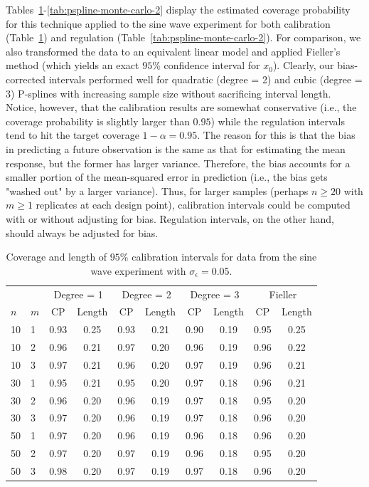 \documentclass[cmfont,usenames,dvipsnames,leqno]{afit-etd}\usepackage[]{graphicx}\usepackage[]{color}
\begin{document}
Tables~\ref{tab:pspline-monte-carlo-1}-\ref{tab:pspline-monte-carlo-2} display the estimated coverage probability for this technique applied to the sine wave experiment for both calibration (Table~\ref{tab:pspline-monte-carlo-1}) and regulation (Table~\ref{tab:pspline-monte-carlo-2}). For comparison, we also transformed the data to an equivalent linear model and applied Fieller's method (which yields an exact $95\%$ confidence interval for $x_0$). Clearly, our bias-corrected intervals performed well for quadratic (degree = 2) and cubic (degree = 3) \ac{P-spline}s with increasing sample size without sacrificing interval length. Notice, however, that the calibration results are somewhat conservative (i.e., the coverage probability is slightly larger than $0.95$) while the regulation intervals tend to hit the target coverage $1-\alpha = 0.95$. The reason for this is that the bias in predicting a future observation is the same as that for estimating the mean response, but the former has larger variance. Therefore, the bias accounts for a smaller portion of the mean-squared error in prediction (i.e., the bias gets "washed out" by a larger variance). Thus, for larger samples (perhaps $n \ge 20$ with $m \ge 1$ replicates at each design point), calibration intervals could be computed with or without adjusting for bias. Regulation intervals, on the other hand, should always be adjusted for bias.




\begin{table}[H]%
\centering
  \begin{tabular}{llcccccccc}
  \toprule
  \phantom{abc} & \phantom{abc} & \multicolumn{2}{c}{Degree = 1} & \multicolumn{2}{c}{Degree = 2} & \multicolumn{2}{c}{Degree = 3} & \multicolumn{2}{c}{Fieller} \\
  \cline{3-10}
  $n$ & $m$ & CP & Length & CP & Length & CP & Length & CP & Length \\
  \hline
  10  &  1  & 0.93 & 0.25 & 0.93 & 0.21 & 0.90 & 0.19 & 0.95 & 0.25 \\
  10  &  2  & 0.96 & 0.21 & 0.97 & 0.20 & 0.96 & 0.19 & 0.96 & 0.22 \\
  10  &  3  & 0.97 & 0.21 & 0.96 & 0.20 & 0.97 & 0.19 & 0.96 & 0.21 \\
  \hline
  30  &  1  & 0.95 & 0.21 & 0.95 & 0.20 & 0.97 & 0.18 & 0.96 & 0.21 \\
  30  &  2  & 0.96 & 0.20 & 0.96 & 0.19 & 0.97 & 0.18 & 0.95 & 0.20 \\
  30  &  3  & 0.97 & 0.20 & 0.96 & 0.19 & 0.97 & 0.18 & 0.96 & 0.20 \\
  \hline
  50  &  1  & 0.97 & 0.20 & 0.96 & 0.19 & 0.96 & 0.18 & 0.96 & 0.20 \\
  50  &  2  & 0.97 & 0.20 & 0.97 & 0.19 & 0.96 & 0.18 & 0.95 & 0.20 \\
  50  &  3  & 0.98 & 0.20 & 0.97 & 0.19 & 0.97 & 0.18 & 0.96 & 0.20 \\
  \bottomrule
  \end{tabular}
\caption[Semiparametric calibration Monte Carlo simulation]{Coverage and length of $95\%$ calibration intervals for data from the sine wave experiment with $\sigma_\epsilon = 0.05$. \label{tab:pspline-monte-carlo-1}}
\end{table}
\end{document}
